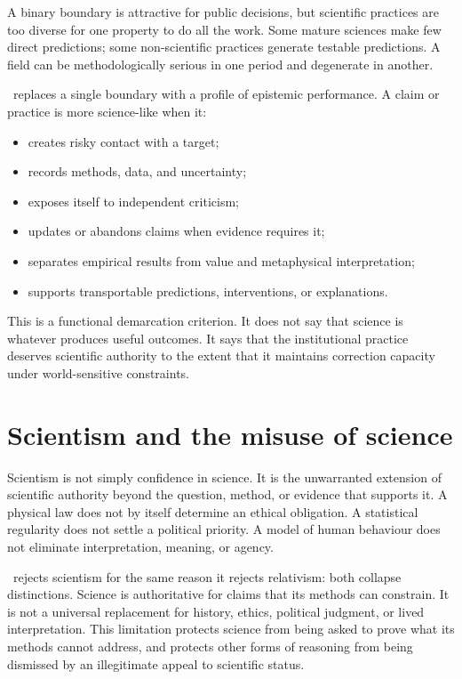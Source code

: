 A binary boundary is attractive for public decisions, but scientific practices
are too diverse for one property to do all the work. Some mature sciences make
few direct predictions; some non-scientific practices generate testable
predictions. A field can be methodologically serious in one period and
degenerate in another.

\RCR\ replaces a single boundary with a profile of epistemic performance. A
claim or practice is more science-like when it:

\begin{itemize}
\item creates risky contact with a target;
\item records methods, data, and uncertainty;
\item exposes itself to independent criticism;
\item updates or abandons claims when evidence requires it;
\item separates empirical results from value and metaphysical interpretation;
\item supports transportable predictions, interventions, or explanations.
\end{itemize}

This is a functional demarcation criterion. It does not say that science is
whatever produces useful outcomes. It says that the institutional practice
deserves scientific authority to the extent that it maintains correction
capacity under world-sensitive constraints.

\section{Scientism and the misuse of science}

Scientism is not simply confidence in science. It is the unwarranted extension
of scientific authority beyond the question, method, or evidence that supports
it. A physical law does not by itself determine an ethical obligation. A
statistical regularity does not settle a political priority. A model of human
behaviour does not eliminate interpretation, meaning, or agency.

\RCR\ rejects scientism for the same reason it rejects relativism: both
collapse distinctions. Science is authoritative for claims that its methods
can constrain. It is not a universal replacement for history, ethics,
political judgment, or lived interpretation. This limitation protects science
from being asked to prove what its methods cannot address, and protects other
forms of reasoning from being dismissed by an illegitimate appeal to scientific
status.

